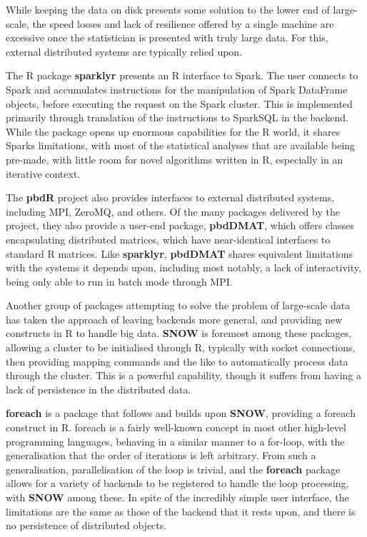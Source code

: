 \documentclass[a4paper,10pt]{article}
\begin{document}
While keeping the data on disk presents some solution to the lower end of
large-scale, the speed losses and lack of resilience offered by a single
machine are excessive once the statistician is presented with truly large data.
For this, external distributed systems are typically relied upon.

The R package \textbf{sparklyr} presents an R interface to Spark\cite{luraschi20}.
The user connects to Spark and accumulates instructions for the manipulation of
Spark DataFrame objects, before executing the request on the Spark cluster.
This is implemented primarily through translation of the instructions to
SparkSQL in the backend.
While the package opens up enormous capabilities for the R world, it shares
Sparks limitations, with most of the statistical analyses that are available
being pre-made, with little room for novel algorithms written in R,
especially in an iterative context.

The \textbf{pbdR} project also provides interfaces to external distributed systems,
including MPI, ZeroMQ, and others\cite{pbdR2012}\cite{pbdBASEpackage}.
Of the many packages delivered by the project, they also provide a user-end
package, \textbf{pbdDMAT}, which offers classes encapsulating distributed matrices,
which have near-identical interfaces to standard R matrices.
Like \textbf{sparklyr}, \textbf{pbdDMAT} shares equivalent limitations with the systems it
depends upon, including most notably, a lack of interactivity, being only able
to run in batch mode through MPI.

Another group of packages attempting to solve the problem of large-scale data
has taken the approach of leaving backends more general, and providing new
constructs in R to handle big data.
\textbf{SNOW} is foremost among these packages, allowing a cluster to be
initialised through R, typically with socket connections, then providing
mapping commands and the like to automatically process data through the
cluster\cite{tierney18}.
This is a powerful capability, though it suffers from having a lack of persistence
in the distributed data.

\textbf{foreach} is a package that follows and builds upon \textbf{SNOW}, providing a
foreach construct in R\cite{microsoft20}.
foreach is a fairly well-known concept in most other high-level programming
languages, behaving in a similar manner to a for-loop, with the generalisation
that the order of iterations is left arbitrary.
From such a generalisation, parallelisation of the loop is trivial, and the
\textbf{foreach} package allows for a variety of backends to be registered to handle the
loop processing, with \textbf{SNOW} among these.
In spite of the incredibly simple user interface, the limitations are the same
as those of the backend that it rests upon, and there is no persistence of
distributed objects.
\end{document}
